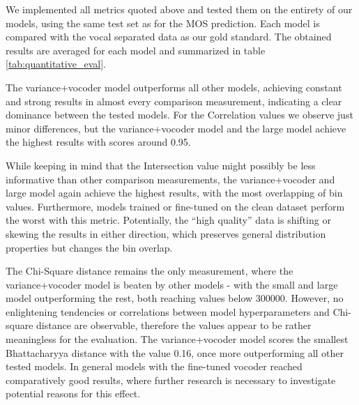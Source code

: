 \documentclass[a4paper]{article}
\begin{document}
	We implemented all metrics quoted above and tested them on the entirety of our models, using the same test set as for the MOS prediction. Each model is compared with the vocal separated data as our gold standard. The obtained results are averaged for each model and summarized in table \ref{tab:quantitative_eval}. 
	
	The variance+vocoder model outperforms all other models, achieving constant and strong results in almost every comparison measurement, indicating a clear dominance between the tested models. 
	For the Correlation values we observe just minor differences, but the variance+vocoder model and the large model achieve the highest results with scores around 0.95. 
	
	While keeping in mind that the Intersection value might possibly be less informative than other comparison measurements, the variance+vocoder and large model again achieve the highest results, with the most overlapping of bin values. Furthermore, models trained or fine-tuned on the clean dataset perform the worst with this metric. Potentially, the “high quality” data is shifting or skewing the results in either direction, which preserves general distribution properties but changes the bin overlap.
	
	The Chi-Square distance remains the only measurement, where the variance+vocoder model is beaten by other models - with the small and large model outperforming the rest, both reaching values below 300000. However, no enlightening tendencies or correlations between model hyperparameters and Chi-square distance are observable, therefore the values appear to be rather meaningless for the evaluation.
	The variance+vocoder model scores the smallest Bhattacharyya distance with the value 0.16, once more outperforming all other tested models. In general models with the fine-tuned vocoder reached comparatively good results, where further research is necessary to investigate potential reasons for this effect.
	
\end{document}

